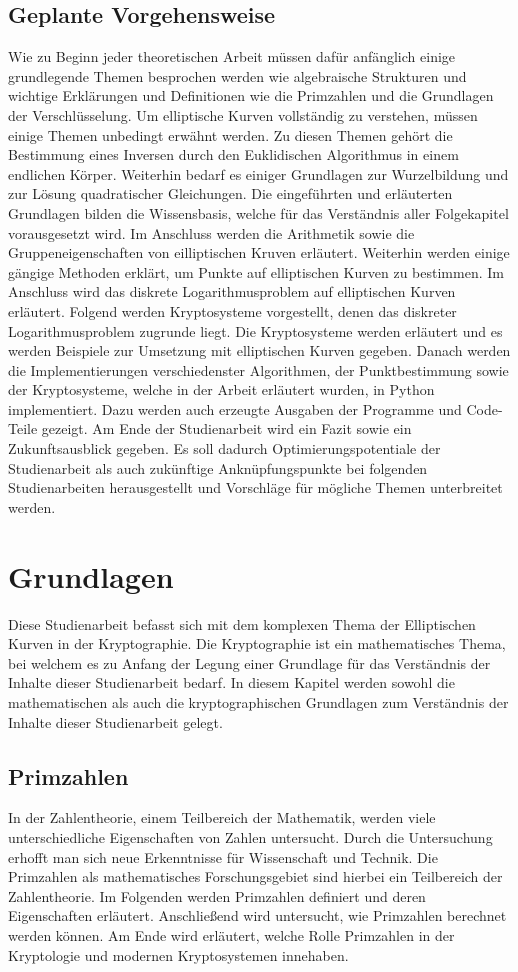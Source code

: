 \section{Geplante Vorgehensweise}
Wie zu Beginn jeder theoretischen Arbeit müssen dafür anfänglich einige grundlegende Themen besprochen werden wie algebraische Strukturen und wichtige Erklärungen und Definitionen wie die Primzahlen und die Grundlagen der Verschlüsselung. Um elliptische Kurven vollständig zu verstehen, müssen einige Themen unbedingt erwähnt werden. Zu diesen Themen gehört die Bestimmung eines Inversen durch den Euklidischen Algorithmus in einem endlichen Körper. Weiterhin bedarf es einiger Grundlagen zur Wurzelbildung und zur Lösung quadratischer Gleichungen. Die eingeführten und erläuterten Grundlagen bilden die Wissensbasis, welche für das Verständnis aller Folgekapitel vorausgesetzt wird. Im Anschluss werden die Arithmetik sowie die Gruppeneigenschaften von eilliptischen Kruven erläutert. Weiterhin werden einige gängige Methoden erklärt, um Punkte auf elliptischen Kurven zu bestimmen. Im Anschluss wird das diskrete Logarithmusproblem auf elliptischen Kurven erläutert. Folgend werden Kryptosysteme vorgestellt, denen das diskreter Logarithmusproblem zugrunde liegt. Die Kryptosysteme werden erläutert und es werden Beispiele zur Umsetzung mit elliptischen Kurven gegeben. Danach werden die Implementierungen verschiedenster Algorithmen, der Punktbestimmung sowie der Kryptosysteme, welche in der Arbeit erläutert wurden, in Python implementiert. Dazu werden auch erzeugte Ausgaben der Programme und Code-Teile gezeigt. Am Ende der Studienarbeit wird ein Fazit sowie ein Zukunftsausblick gegeben. Es soll dadurch Optimierungspotentiale der Studienarbeit als auch zukünftige Anknüpfungspunkte bei folgenden Studienarbeiten herausgestellt und Vorschläge für mögliche Themen unterbreitet werden.

\chapter{Grundlagen}\label{sec:grundlagen}
Diese Studienarbeit befasst sich mit dem komplexen Thema der Elliptischen Kurven in der Kryptographie. Die Kryptographie ist ein mathematisches Thema, bei welchem es zu Anfang der Legung einer Grundlage für das Verständnis der Inhalte dieser Studienarbeit bedarf. In diesem Kapitel werden sowohl die mathematischen als auch die kryptographischen Grundlagen zum Verständnis der Inhalte dieser Studienarbeit gelegt.

\section{Primzahlen}
In der Zahlentheorie, einem Teilbereich der Mathematik, werden viele unterschiedliche Eigenschaften von Zahlen untersucht. Durch die Untersuchung erhofft man sich neue Erkenntnisse für Wissenschaft und Technik. Die Primzahlen als mathematisches Forschungsgebiet sind hierbei ein Teilbereich der Zahlentheorie. Im Folgenden werden Primzahlen definiert und deren Eigenschaften erläutert. Anschließend wird untersucht, wie Primzahlen berechnet werden können. Am Ende wird erläutert, welche Rolle Primzahlen in der Kryptologie und modernen Kryptosystemen innehaben.

